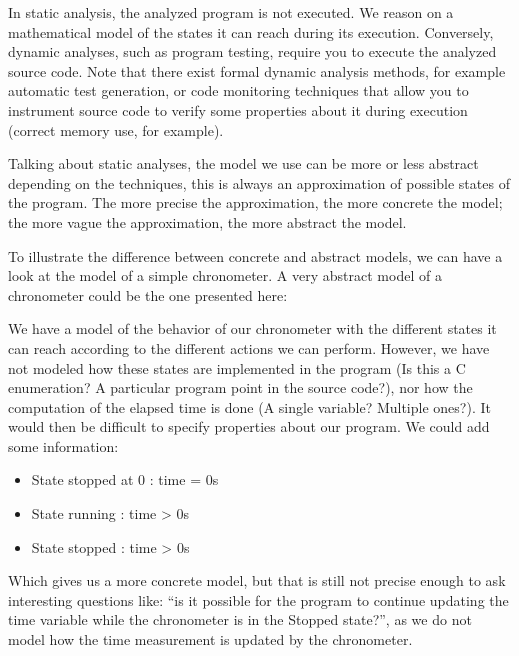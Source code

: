 In static analysis, the analyzed program is not executed. We reason on a
mathematical model of the states it can reach during its execution.
Conversely, dynamic analyses, such as program testing, require you to
execute the analyzed source code. Note that there exist formal dynamic
analysis methods, for example automatic test generation, or code
monitoring techniques that allow you to instrument source code to verify
some properties about it during execution (correct memory use, for
example).



Talking about static analyses, the model we use can be more or less
abstract depending on the techniques, this is always an approximation of
possible states of the program. The more precise the approximation,
the more concrete the model; the more vague the approximation, the
more abstract the model.



To illustrate the difference between concrete and abstract models, we can
have a look at the model of a simple chronometer. A very abstract model of
a chronometer could be the one presented here:





We have a model of the behavior of our chronometer with the different
states it can reach according to the different actions we can perform.
However, we have not modeled how these states are implemented in the
program (Is this a C enumeration? A particular program point in the
source code?), nor how the computation of the elapsed time is done (A single
variable? Multiple ones?). It would then be difficult to specify
properties about our program. We could add some information:


\begin{itemize}
\item State stopped at 0 : time = 0s
\item State running : time > 0s
\item State stopped : time > 0s
\end{itemize}



Which gives us a more concrete model, but that is still not precise
enough to ask interesting questions like: ``is it possible for the program
to continue updating the time variable while the chronometer is in the Stopped
state?'', as we do not model how the time measurement is updated by the
chronometer.



